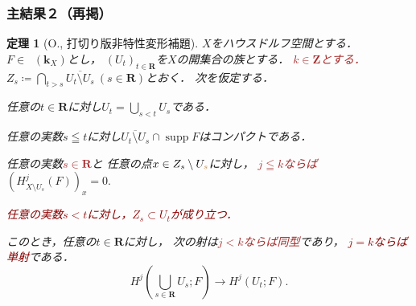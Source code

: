 \documentclass[dvipdfmx,10pt,aspectratio=169,leqno]{beamer}%
\newcommand{\zz}{\mathbf{Z}}
\newcommand{\rr}{\mathbf{R}}
\newcommand{\kk}{\mathbf{k}}
\numberwithin{equation}{subsection}
\newcommand{\supp}{\mathop{\mathrm{supp}}\nolimits}
\newcommand{\Dompl}{\mathop{\mathsf{D}^\mathrm{+}}\nolimits}
\theoremstyle{mystyle}
\newtheorem{THM}[AXM]{定理}
\begin{document}
\begin{frame}
    \frametitle{主結果２（再掲）}
  \begin{THM}[O., 打切り版非特性変形補題]
    \(X\)をハウスドルフ空間とする．
    \(F\in\Dompl(\kk_X)\)とし，
    \(\left(U_{t}\right)_{t\in\rr}\)を\(X\)の開集合の族とする．
    \textcolor{brown}{\(k\in\zz\)とする．}
    \(
      Z_{s}\coloneqq \bigcap_{t>s}\overline{U_t\setminus U_s}\ (s\in\rr)
    \)とおく．
    次を仮定する．%
    \begin{enumerate}[(i)]
      \setlength{\leftskip}{10pt}
      \item %
      任意の\(t\in\rr\)に対し\(U_{t}=\bigcup_{s<t}U_{s}\)である．
      \item %
      任意の実数\(s\leqq t\)に対し\(
        \overline{U_{t}\setminus U_{s}}\cap \supp{F}
      \)はコンパクトである．
      \item %
      任意の実数\textcolor{brown}{\(s\in\rr\)}と
      任意の点\(x\in Z_{s}\setminus U_{\textcolor{brown}{s}}\)に対し，
      \textcolor{brown}{\(j\leqq k\)ならば}
      \(
        (H^{j}_{X\setminus U_{s}}(F))_{x}=0. 
      \)
      \textcolor{darkred}{\item %
      任意の実数\(s< t\)に対し，\(Z_s\subset U_{t}\)が成り立つ．}
    \end{enumerate}
    このとき，任意の\(t\in\rr\)に対し，
    次の射は\textcolor{brown}{\(j<k\)ならば同型}であり，
    \textcolor{darkred}{\(j=k\)ならば単射}である．
    \[
      H^{j}\left(\bigcup_{s\in\rr}U_{s};F\right)
      \to
      H^{j}\left(U_{t};F\right).
    \]
  \end{THM}
\end{frame}
\end{document}
